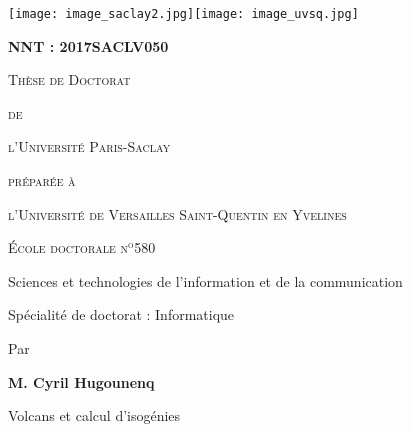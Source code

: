 \documentclass[a4paper, titlepage, 11pt]{book}
\newcommand{\titre}{Volcans et calcul d'isogénies}
\begin{document}
\frontmatter
\pagestyle{empty}

 \texttt{[image: image\_saclay2.jpg]}\hfill\texttt{[image: image\_uvsq.jpg]}
\begin{breakbox}
\textbf{NNT : 2017SACLV050}%

\vspace{3cm}

\begin{center}
{\Large\textsc{Thèse de Doctorat}

\textsc{de}

\textsc{l’Université Paris-Saclay}

\textsc{préparée à}

\textsc{l’Université de Versailles Saint-Quentin en Yvelines}

}

\vspace{6ex}

{\large\textsc{École doctorale n$^\textrm{o}$580}

Sciences et technologies de l'information et de la communication

\vspace{1ex}

Spécialité de doctorat : Informatique

}

\vspace{6ex}

Par


\vspace{1ex}

{\large\textbf{M. Cyril Hugounenq}

\vspace{1ex}

\titre

}
\end{center}

\vspace{3ex}

\noindent

\vspace{2ex}

\noindent

\vspace{2ex}


\end{breakbox}
\end{document}
